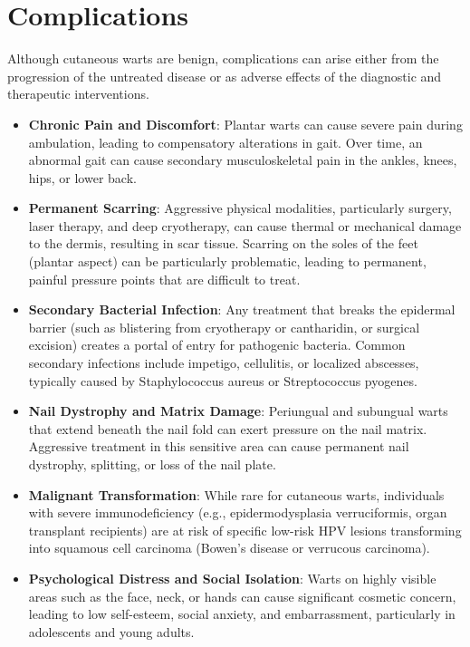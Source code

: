 \section*{Complications}
Although cutaneous warts are benign, complications can arise either from the progression of the untreated disease or as adverse effects of the diagnostic and therapeutic interventions.

\begin{itemize}
    \item \textbf{Chronic Pain and Discomfort}: Plantar warts can cause severe pain during ambulation, leading to compensatory alterations in gait. Over time, an abnormal gait can cause secondary musculoskeletal pain in the ankles, knees, hips, or lower back.
    \item \textbf{Permanent Scarring}: Aggressive physical modalities, particularly surgery, laser therapy, and deep cryotherapy, can cause thermal or mechanical damage to the dermis, resulting in scar tissue. Scarring on the soles of the feet (plantar aspect) can be particularly problematic, leading to permanent, painful pressure points that are difficult to treat.
    \item \textbf{Secondary Bacterial Infection}: Any treatment that breaks the epidermal barrier (such as blistering from cryotherapy or cantharidin, or surgical excision) creates a portal of entry for pathogenic bacteria. Common secondary infections include impetigo, cellulitis, or localized abscesses, typically caused by Staphylococcus aureus or Streptococcus pyogenes.
    \item \textbf{Nail Dystrophy and Matrix Damage}: Periungual and subungual warts that extend beneath the nail fold can exert pressure on the nail matrix. Aggressive treatment in this sensitive area can cause permanent nail dystrophy, splitting, or loss of the nail plate.
    \item \textbf{Malignant Transformation}: While rare for cutaneous warts, individuals with severe immunodeficiency (e.g., epidermodysplasia verruciformis, organ transplant recipients) are at risk of specific low-risk HPV lesions transforming into squamous cell carcinoma (Bowen's disease or verrucous carcinoma).
    \item \textbf{Psychological Distress and Social Isolation}: Warts on highly visible areas such as the face, neck, or hands can cause significant cosmetic concern, leading to low self-esteem, social anxiety, and embarrassment, particularly in adolescents and young adults.
\end{itemize}


